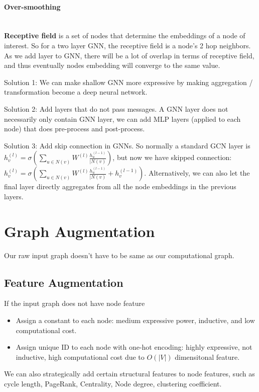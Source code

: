 \paragraph{Over-smoothing}\mbox{}\\
\textbf{Receptive field} is a set of nodes that determine the embeddings of a node of interest. So for a two layer GNN, the receptive field is a node's 2 hop neighbors. As we add layer to GNN, there will be a lot of overlap in terms of receptive field, and thus eventually nodes embedding will converge to the same value. \\\par

Solution 1: We can make shallow GNN more expressive by making aggregation / transformation become a deep neural network. \\ \par

Solution 2: Add layers that do not pass messages. A GNN layer does not necessarily only contain GNN layer, we can add MLP layers (applied to each node) that does pre-process and post-process. \\ \par

Solution 3: Add skip connection in GNNs. So normally a standard GCN layer is $h_v^{(l)} = \sigma(\sum_{u \in N(v)} W^{(l)} \frac{h_u^{(l-1)}}{|N(v)})$, but now we have skipped connection: $h_v^{(l)} = \sigma(\sum_{u \in N(v)} W^{(l)} \frac{h_u^{(l-1)}}{|N(v)} + h_v^{(l-1)})$. Alternatively, we can also let the final layer directly aggregates from all the node embeddings in the previous layers. 


\section{Graph Augmentation} 
Our raw input graph doesn't have to be same as our computational graph. 
\subsection{Feature Augmentation}
If the input graph does not have node feature
    \begin{itemize}
        \item Assign a constant to each node: medium expressive power, inductive, and low computational cost.
        \item Assign unique ID to each node with one-hot encoding: highly expressive, not inductive, high computational cost due to $O(|V|)$ dimensitonal feature. 
    \end{itemize}
We can also strategically add certain structural features to node features, such as cycle length, PageRank, Centrality, Node degree, clustering coefficient. 

